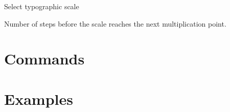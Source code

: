 \documentclass{ltxdoc}
\begin{document}
\noindent {} Select typographic scale

\noindent {} Number of steps before the scale reaches the next multiplication point.

\noindent {} 




\section{Commands}

\DescribeMacro\setsizes
\cmd\setsizes{}


\section{Examples}
\end{document}
